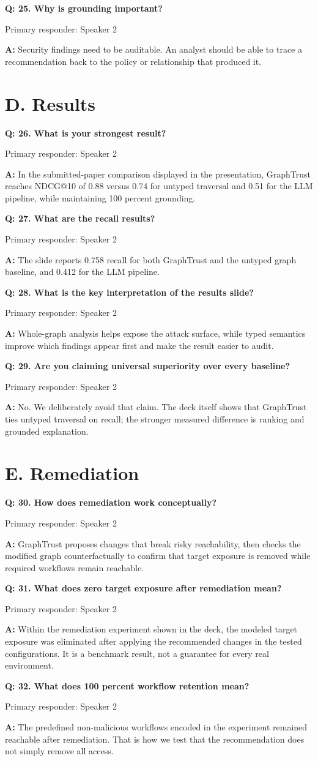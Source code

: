 \documentclass[11pt,a4paper]{article}
\newcommand{\q}[1]{\vspace{0.35em}\textbf{Q: #1}\par}
\newcommand{\a}[1]{\textbf{A:} #1\par}
\newcommand{\owner}[1]{\textcolor{Muted}{\small Primary responder: #1}\par}
\begin{document}
\q{25. Why is grounding important?}
\owner{Speaker 2}
\a{Security findings need to be auditable. An analyst should be able to trace a recommendation back to the policy or relationship that produced it.}

\section*{D. Results}

\q{26. What is your strongest result?}
\owner{Speaker 2}
\a{In the submitted-paper comparison displayed in the presentation, GraphTrust reaches NDCG@10 of 0.88 versus 0.74 for untyped traversal and 0.51 for the LLM pipeline, while maintaining 100 percent grounding.}

\q{27. What are the recall results?}
\owner{Speaker 2}
\a{The slide reports 0.758 recall for both GraphTrust and the untyped graph baseline, and 0.412 for the LLM pipeline.}

\q{28. What is the key interpretation of the results slide?}
\owner{Speaker 2}
\a{Whole-graph analysis helps expose the attack surface, while typed semantics improve which findings appear first and make the result easier to audit.}

\q{29. Are you claiming universal superiority over every baseline?}
\owner{Speaker 2}
\a{No. We deliberately avoid that claim. The deck itself shows that GraphTrust ties untyped traversal on recall; the stronger measured difference is ranking and grounded explanation.}

\section*{E. Remediation}

\q{30. How does remediation work conceptually?}
\owner{Speaker 2}
\a{GraphTrust proposes changes that break risky reachability, then checks the modified graph counterfactually to confirm that target exposure is removed while required workflows remain reachable.}

\q{31. What does zero target exposure after remediation mean?}
\owner{Speaker 2}
\a{Within the remediation experiment shown in the deck, the modeled target exposure was eliminated after applying the recommended changes in the tested configurations. It is a benchmark result, not a guarantee for every real environment.}

\q{32. What does 100 percent workflow retention mean?}
\owner{Speaker 2}
\a{The predefined non-malicious workflows encoded in the experiment remained reachable after remediation. That is how we test that the recommendation does not simply remove all access.}
\end{document}
